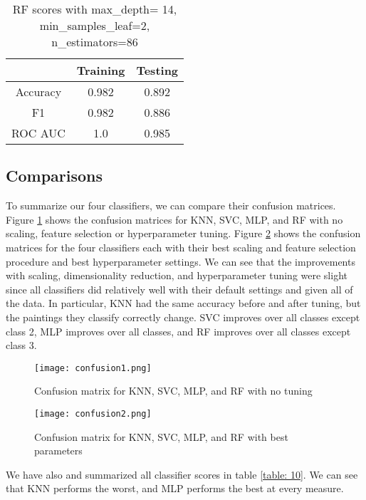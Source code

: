 \documentclass[12pt]{article}
\begin{document}
\begin{table}[h!]
	\centering
	\begin{tabular}{| c|cc|} 
		\hline
		& Training & Testing\\ \hline
		Accuracy & 0.982 &0.892 \\ 
		F1 &  0.982 &0.886\\ 
		ROC AUC & 1.0 &0.985\\
		\hline
	\end{tabular}
	\caption{RF scores with max\_depth= 14, min\_samples\_leaf=2, n\_estimators=86}
	\label{table: 9}
\end{table}
\FloatBarrier

\subsection{Comparisons}

To summarize our four classifiers, we can compare their confusion matrices. Figure \ref{fig:confmat1} shows the confusion matrices for KNN, SVC, MLP, and RF with no scaling, feature selection or hyperparameter tuning. Figure \ref{fig:confmat2} shows the confusion matrices for the four classifiers each with their best scaling and feature selection procedure and best hyperparameter settings. We can see that the improvements with scaling, dimensionality reduction, and hyperparameter tuning were slight since all classifiers did relatively well with their default settings and given all of the data. In particular, KNN had the same accuracy before and after tuning, but the paintings they classify correctly change. SVC improves over all classes except class 2, MLP improves over all classes, and RF improves over all classes except class 3.

\begin{figure}[h]
	\centering
	\texttt{[image: confusion1.png]}
	\caption{Confusion matrix for KNN, SVC, MLP, and RF with no tuning}
	\label{fig:confmat1}
\end{figure}

\begin{figure}[h]
	\centering
	\texttt{[image: confusion2.png]}
	\caption{Confusion matrix for KNN, SVC, MLP, and RF with best parameters}
	\label{fig:confmat2}
\end{figure}

We have also and summarized all classifier scores in table \ref{table: 10}. We can see that KNN performs the worst, and MLP performs the best at every measure.
\end{document}
